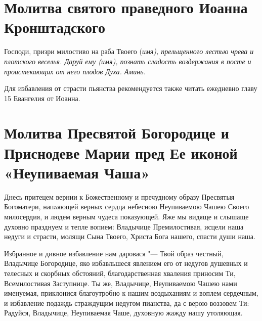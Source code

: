 \section{Молитва святого праведного Иоанна Кронштадского}
 


Господи, призри милостиво на раба Твоего (\itshape имя\normalfont{}), прельщенного лестью чрева и плотского веселья. Даруй ему (\itshape имя\normalfont{}), познать сладость воздержания в посте и проистекающих от него плодов Духа. Аминь.

\itshape 

Для избавления от страсти пьянства рекомендуется также читать ежедневно главу 15 Евангелия от Иоанна.\normalfont{}


\section{Молитва Пресвятой Богородице и Приснодеве Марии пред  Ее иконой «Неупиваемая Чаша»}
 




Днесь притецем вернии к Божественному и пречудному образу Пресвятыя Богоматери, напaяющей верных сердца небесною Неупиваемою Чашею Своего милосердия, и людем верным чудеса показующей. Яже мы видяще и слышаще духовно празднуем и тепле вопием: Владычице Премилостивая, исцели наша недуги и страсти, молящи Сына Твоего, Христа Бога нашего, спасти души наша.




Избранное и дивное избавление нам даровася "--- Твой образ честный, Владычице Богородице, яко избавльшеся явлением его от недугов душевных и телесных и скорбных обстояний, благодарственная хваления приносим Ти, Всемилостивая Заступнице. Ты же, Владычице, Неупиваемою Чашею нами именуемая, приклонися благоутробно к нашим воздыханиям и воплем сердечным, и избавление подаждь страждущим недугом пианства, да с верою воззовем Ти: Радуйся, Владычице, Неупиваемая Чаше, духовную жажду нашу утоляющая.




